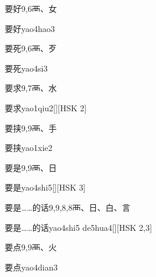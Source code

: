 \begin{entry}{要好}{9,6}{⾑、⼥}
  \begin{phonetics}{要好}{yao4hao3}
  \end{phonetics}
\end{entry}

\begin{entry}{要死}{9,6}{⾑、⽍}
  \begin{phonetics}{要死}{yao4si3}
  \end{phonetics}
\end{entry}

\begin{entry}{要求}{9,7}{⾑、⽔}
  \begin{phonetics}{要求}{yao1qiu2}[][HSK 2]
  \end{phonetics}
\end{entry}

\begin{entry}{要挟}{9,9}{⾑、⼿}
  \begin{phonetics}{要挟}{yao1xie2}
  \end{phonetics}
\end{entry}

\begin{entry}{要是}{9,9}{⾑、⽇}
  \begin{phonetics}{要是}{yao4shi5}[][HSK 3]
  \end{phonetics}
\end{entry}

\begin{entry}{要是……的话}{9,9,8,8}{⾑、⽇、⽩、⾔}
  \begin{phonetics}{要是……的话}{yao4shi5 de5hua4}[][HSK 2,3]
  \end{phonetics}
\end{entry}

\begin{entry}{要点}{9,9}{⾑、⽕}
  \begin{phonetics}{要点}{yao4dian3}
  \end{phonetics}
\end{entry}


